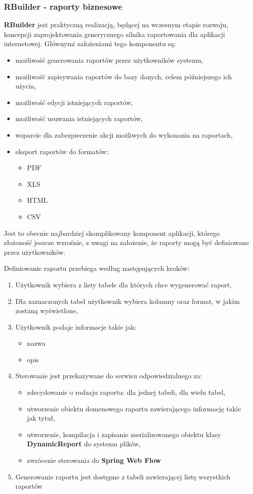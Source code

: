 \subsubsection{RBuilder - raporty biznesowe}
	\textbf{RBuilder} jest praktyczną realizacją, będącej na wczesnym etapie rozwoju, koncepcji zaprojektowania generycznego
	silnika raportowania dla aplikacji internetowej. Głównymi założeniami tego komponentu są:
	\begin{itemize}
		\item możliwość generowania raportów przez użytkowników systemu,
		\item możliwość zapisywania raportów do bazy danych, celem późniejszego ich użycia,
		\item możliwość edycji istniejących raportów,
		\item możliwość usuwania istniejących raportów,
		\item wsparcie dla zabezpieczenie akcji możliwych do wykonania na raportach,
		\item eksport raportów do formatów:
		\begin{itemize}	\label{app:rbuilder_representations}
			\item PDF
			\item XLS
			\item HTML
			\item CSV
		\end{itemize}
	\end{itemize}		
	Jest to obecnie najbardziej skomplikowany komponent aplikacji, którego złożoność jeszcze wzrośnie, z uwagi
	na założenie, że raporty mogą być definiowane przez użytkowników. 
	
	Definiowanie raportu przebiega według następujących kroków:
	\begin{enumerate}
		\item Użytkownik wybiera z listy tabele dla których chce wygenerować raport,
		\item Dla zaznaczonych tabel użytkownik wybiera kolumny oraz format, w jakim zostaną wyświetlone,
		\item Użytkownik podaje informacje takie jak:
		\begin{itemize}
			\item nazwa
			\item opis
		\end{itemize}
		\item Sterowanie jest przekazywane do serwisu odpowiedzialnego za:
		\begin{itemize}
			\item zdecydowanie o rodzaju raportu: dla jednej tabeli, dla wielu tabel,
			\item utworzenie obiektu domenowego raportu zawierającego informację takie jak tytuł,
			\item utworzenie, kompilacja i zapisanie zserializowanego obiektu klasy \textbf{DynamicReport} do systemu plików,
			\item zwrócenie sterowania do \textbf{Spring Web Flow}
		\end{itemize}
		\item Generowanie raportu jest dostępne z tabeli zawierającej listę wszystkich raportów
	\end{enumerate}
	
